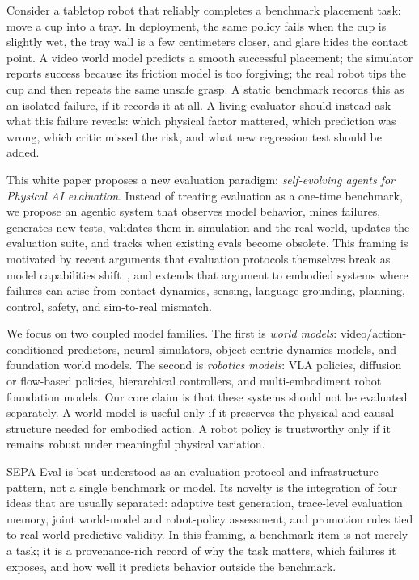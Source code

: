 \documentclass[sigconf,review,anonymous]{acmart}
\newcommand{\system}{SEPA-Eval\xspace}
\begin{document}
Consider a tabletop robot that reliably completes a benchmark placement task: move a cup into a tray. In deployment, the same policy fails when the cup is slightly wet, the tray wall is a few centimeters closer, and glare hides the contact point. A video world model predicts a smooth successful placement; the simulator reports success because its friction model is too forgiving; the real robot tips the cup and then repeats the same unsafe grasp. A static benchmark records this as an isolated failure, if it records it at all. A living evaluator should instead ask what this failure reveals: which physical factor mattered, which prediction was wrong, which critic missed the risk, and what new regression test should be added.

This white paper proposes a new evaluation paradigm: \emph{self-evolving agents for Physical AI evaluation}. Instead of treating evaluation as a one-time benchmark, we propose an agentic system that observes model behavior, mines failures, generates new tests, validates them in simulation and the real world, updates the evaluation suite, and tracks when existing evals become obsolete. This framing is motivated by recent arguments that evaluation protocols themselves break as model capabilities shift~\cite{wang2025evalsbreak}, and extends that argument to embodied systems where failures can arise from contact dynamics, sensing, language grounding, planning, control, safety, and sim-to-real mismatch.

We focus on two coupled model families. The first is \emph{world models}: video/action-conditioned predictors, neural simulators, object-centric dynamics models, and foundation world models. The second is \emph{robotics models}: VLA policies, diffusion or flow-based policies, hierarchical controllers, and multi-embodiment robot foundation models. Our core claim is that these systems should not be evaluated separately. A world model is useful only if it preserves the physical and causal structure needed for embodied action. A robot policy is trustworthy only if it remains robust under meaningful physical variation.

\system is best understood as an evaluation protocol and infrastructure pattern, not a single benchmark or model. Its novelty is the integration of four ideas that are usually separated: adaptive test generation, trace-level evaluation memory, joint world-model and robot-policy assessment, and promotion rules tied to real-world predictive validity. In this framing, a benchmark item is not merely a task; it is a provenance-rich record of why the task matters, which failures it exposes, and how well it predicts behavior outside the benchmark.
\end{document}
